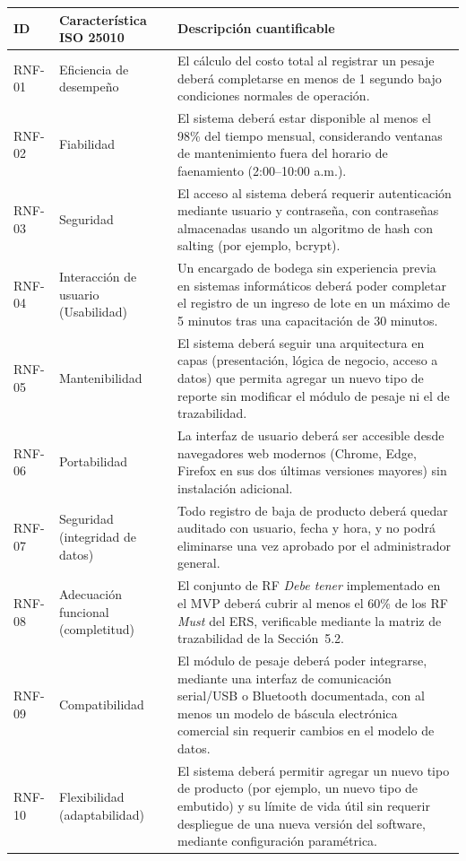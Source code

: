 \documentclass[11pt,a4paper]{article}
\begin{document}
\begin{longtable}{|p{1.4cm}|p{3cm}|p{9.5cm}|}
\hline
\textbf{ID} & \textbf{Característica ISO 25010} & \textbf{Descripción cuantificable} \\
\hline
RNF-01 & Eficiencia de desempeño & El cálculo del costo total al registrar un pesaje deberá completarse en menos de 1 segundo bajo condiciones normales de operación. \\
\hline
RNF-02 & Fiabilidad & El sistema deberá estar disponible al menos el 98\% del tiempo mensual, considerando ventanas de mantenimiento fuera del horario de faenamiento (2:00--10:00 a.m.). \\
\hline
RNF-03 & Seguridad & El acceso al sistema deberá requerir autenticación mediante usuario y contraseña, con contraseñas almacenadas usando un algoritmo de hash con salting (por ejemplo, bcrypt). \\
\hline
RNF-04 & Interacción de usuario (Usabilidad) & Un encargado de bodega sin experiencia previa en sistemas informáticos deberá poder completar el registro de un ingreso de lote en un máximo de 5 minutos tras una capacitación de 30 minutos. \\
\hline
RNF-05 & Mantenibilidad & El sistema deberá seguir una arquitectura en capas (presentación, lógica de negocio, acceso a datos) que permita agregar un nuevo tipo de reporte sin modificar el módulo de pesaje ni el de trazabilidad. \\
\hline
RNF-06 & Portabilidad & La interfaz de usuario deberá ser accesible desde navegadores web modernos (Chrome, Edge, Firefox en sus dos últimas versiones mayores) sin instalación adicional. \\
\hline
RNF-07 & Seguridad (integridad de datos) & Todo registro de baja de producto deberá quedar auditado con usuario, fecha y hora, y no podrá eliminarse una vez aprobado por el administrador general. \\
\hline
RNF-08 & Adecuación funcional (completitud) & El conjunto de RF \textit{Debe tener} implementado en el MVP deberá cubrir al menos el 60\% de los RF \textit{Must} del ERS, verificable mediante la matriz de trazabilidad de la Sección~5.2. \\
\hline
RNF-09 & Compatibilidad & El módulo de pesaje deberá poder integrarse, mediante una interfaz de comunicación serial/USB o Bluetooth documentada, con al menos un modelo de báscula electrónica comercial sin requerir cambios en el modelo de datos. \\
\hline
RNF-10 & Flexibilidad (adaptabilidad) & El sistema deberá permitir agregar un nuevo tipo de producto (por ejemplo, un nuevo tipo de embutido) y su límite de vida útil sin requerir despliegue de una nueva versión del software, mediante configuración paramétrica. \\

\end{longtable}
\end{document}
